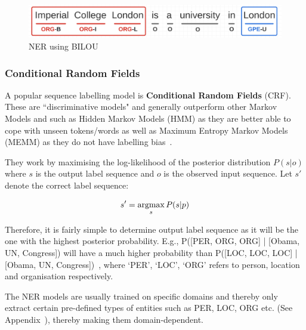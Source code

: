 \begin{figure}[H]
    \centering
    \includegraphics[scale=0.35]{images/bilou.png}
    \caption{NER using BILOU}
    \label{fig:bilou}
    \end{figure}

\subsubsection*{Conditional Random Fields}
A popular sequence labelling model is \textbf{Conditional Random Fields }(CRF). These are ``discriminative models" and generally outperform other Markov Models and such as Hidden Markov Models (HMM) as they are better able to cope with unseen tokens/words as well as Maximum Entropy Markov Models (MEMM) as they do not have labelling bias~\cite{crf}.

They work by maximising the log-likelihood of the posterior distribution $P(s|o)$ where $s$ is the output label sequence and $o$ is the observed input sequence. Let $s'$ denote the correct label sequence: 

\[ s' = \operatorname*{argmax}_{s} P (s|p) \]

Therefore, it is fairly simple to determine output label sequence as it will be the one with the highest posterior probability. E.g., P([PER, ORG, ORG] | [Obama, UN, Congress]) will have a much higher probability than  P([LOC, LOC, LOC] | [Obama, UN, Congress])~\cite{crf}, where `PER', `LOC', `ORG' refers to person, location and organisation respectively.

The NER models are usually trained on specific domains and thereby only extract certain pre-defined types of entities such as PER, LOC, ORG etc. (See Appendix~), thereby making them domain-dependent.



